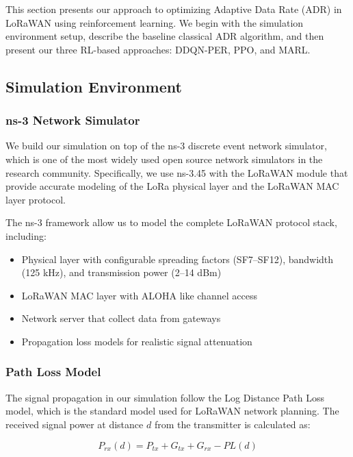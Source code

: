 \documentclass[12pt,a4paper]{article}
\begin{document}
This section presents our approach to optimizing Adaptive Data Rate (ADR) in LoRaWAN using reinforcement learning. We begin with the simulation environment setup, describe the baseline classical ADR algorithm, and then present our three RL-based approaches: DDQN-PER, PPO, and MARL.

\subsection{Simulation Environment}
\label{subsec:simulation_environment}

\subsubsection{ns-3 Network Simulator}

We build our simulation on top of the ns-3 discrete event network simulator, which is one of the most widely used open source network simulators in the research community. Specifically, we use ns-3.45 with the LoRaWAN module that provide accurate modeling of the LoRa physical layer and the LoRaWAN MAC layer protocol.

The ns-3 framework allow us to model the complete LoRaWAN protocol stack, including:
\begin{itemize}
    \item Physical layer with configurable spreading factors (SF7--SF12), bandwidth (125 kHz), and transmission power (2--14 dBm)
    \item LoRaWAN MAC layer with ALOHA like channel access
    \item Network server that collect data from gateways
    \item Propagation loss models for realistic signal attenuation
\end{itemize}

\subsubsection{Path Loss Model}

The signal propagation in our simulation follow the Log Distance Path Loss model, which is the standard model used for LoRaWAN network planning. The received signal power at distance $d$ from the transmitter is calculated as:

\begin{equation}
    P_{rx}(d) = P_{tx} + G_{tx} + G_{rx} - PL(d)
    \label{eq:link_budget}
\end{equation}
\end{document}
